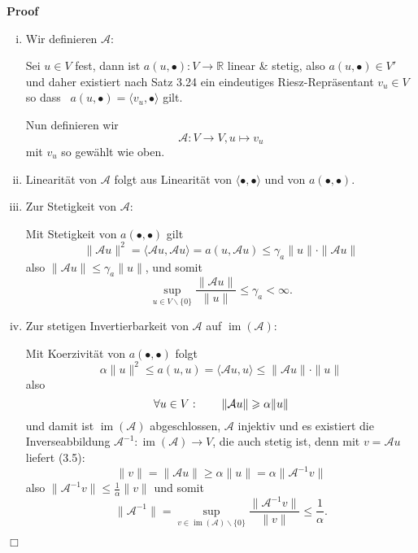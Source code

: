 \documentclass{book}
\newcommand{\tmop}[1]{\ensuremath{\operatorname{#1}}}
\newenvironment{enumerateroman}{\begin{enumerate}[i.] }{\end{enumerate}}
\newenvironment{proof}{\noindent\textbf{Proof\ }}{\hspace*{\fill}$\Box$\medskip}
\begin{document}
\begin{proof}
  
  \begin{enumerateroman}
    \item Wir definieren $\mathcal{A}$:
    
    Sei $u \in V$ fest, dann ist $a (u, \bullet) : V \rightarrow \mathbb{R}$
    linear \& stetig, also $a (u, \bullet) \in V'$ und daher existiert nach
    Satz 3.24 ein eindeutiges Riesz-Repr{\"a}sentant $v_u \in V$ so dass \ $a
    (u, \bullet) = \langle v_u, \bullet \rangle$ gilt.
    
    Nun definieren wir
    \[ \mathcal{A} : V \rightarrow V, u \mapsto v_u \]
    mit $v_u$ so gew{\"a}hlt wie oben.
    
    \item Linearit{\"a}t von $\mathcal{A}$ folgt aus Linearit{\"a}t von
    $\langle \bullet, \bullet \rangle$ und von $a (\bullet, \bullet)$.
    
    \item Zur Stetigkeit von $\mathcal{A}$:
    
    Mit Stetigkeit von $a (\bullet, \bullet)$ gilt
    \[ \| \mathcal{A} u \|^2 = \langle \mathcal{A} u, \mathcal{A} u \rangle =
       a (u, \mathcal{A} u) \leqslant \gamma_a \| u \| \cdot \| \mathcal{A} u
       \| \]
    also $\| \mathcal{A} u \| \leqslant \gamma_a \| u \|$, und somit
    \[ \sup_{u \in V \backslash \{ 0 \}} \frac{\| \mathcal{A} u \|}{\| u \|}
       \leqslant \gamma_a < \infty . \]
    \item Zur stetigen Invertierbarkeit von $\mathcal{A}$ auf $\tmop{im}
    (\mathcal{A})$:
    
    Mit Koerzivit{\"a}t von $a (\bullet, \bullet)$ folgt
    \[ \alpha \| u \|^2 \leqslant a (u, u) = \langle \mathcal{A} u, u \rangle
       \leqslant \| \mathcal{A} u \| \cdot \| u \| \]
    also
    \begin{equation}
      \forall u \in V : \text{\qquad} \| \mathcal{A} u \| \geqslant \alpha \|
      u \|
    \end{equation}
    und damit ist $\tmop{im} (\mathcal{A})$ abgeschlossen, $\mathcal{A}$
    injektiv und es existiert die Inverseabbildung $\mathcal{A}^{- 1} :
    \tmop{im} (\mathcal{A}) \rightarrow V$, die auch stetig ist, denn mit $v =
    \mathcal{A} u$ liefert (3.5):
    \[ \| v \| = \| \mathcal{A} u \| \geqslant \alpha \| u \| = \alpha \|
       \mathcal{A}^{- 1} v \| \]
    also $\| \mathcal{A}^{- 1} v \| \leqslant \frac{1}{\alpha} \| v \|$ und
    somit
    \[ \| \mathcal{A}^{- 1} \| = \sup_{v \in \tmop{im} (\mathcal{A})
       \backslash \{ 0 \}} \frac{\| \mathcal{A}^{- 1} v \|}{\| v \|} \leqslant
       \frac{1}{\alpha} . \]
    

\end{enumerateroman}
\end{proof}
\end{document}
